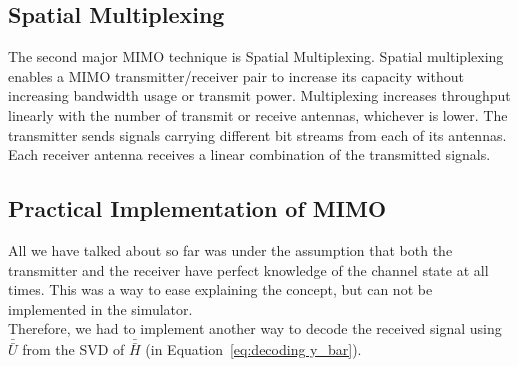 \subsection{Spatial Multiplexing}
\label{subsection:MIMO-Multiplexing}
The second major MIMO technique is Spatial Multiplexing. Spatial multiplexing enables a MIMO transmitter/receiver pair to increase its capacity without increasing bandwidth usage or transmit power. Multiplexing increases throughput linearly with the number of transmit or receive antennas, whichever is lower. The transmitter sends signals carrying different bit streams from each of its antennas. Each receiver antenna receives a linear combination of the transmitted signals.


\subsection{Practical Implementation of MIMO}
All we have talked about so far was under the assumption that both the transmitter and the receiver have perfect knowledge of the channel state at all times. This was a way to ease explaining the concept, but can not be implemented in the simulator.\\
Therefore, we had to implement another way to decode the received signal using $\bar{\bar{U}}$ from the SVD of $\bar{\bar{H}}$ (in Equation~\ref{eq:decoding y_bar}).